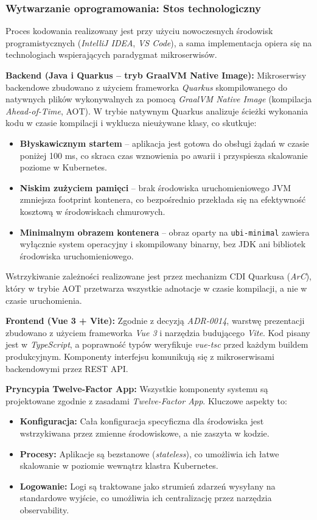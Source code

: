 \subsubsection{Wytwarzanie oprogramowania: Stos technologiczny}
Proces kodowania realizowany jest przy użyciu nowoczesnych środowisk programistycznych (\textit{IntelliJ IDEA}, \textit{VS Code}), a sama implementacja opiera się na technologiach wspierających paradygmat mikroserwisów.

\textbf{Backend (Java i Quarkus -- tryb GraalVM Native Image):}
Mikroserwisy backendowe zbudowano z użyciem frameworka \textit{Quarkus} skompilowanego do natywnych plików wykonywalnych za pomocą \textit{GraalVM Native Image} (kompilacja \textit{Ahead-of-Time}, AOT). W trybie natywnym Quarkus analizuje ścieżki wykonania kodu w czasie kompilacji i wyklucza nieużywane klasy, co skutkuje:
\begin{itemize}
    \item \textbf{Błyskawicznym startem} -- aplikacja jest gotowa do obsługi żądań w czasie poniżej 100 ms, co skraca czas wznowienia po awarii i przyspiesza skalowanie poziome w Kubernetes.
    \item \textbf{Niskim zużyciem pamięci} -- brak środowiska uruchomieniowego JVM zmniejsza footprint kontenera, co bezpośrednio przekłada się na efektywność kosztową w środowiskach chmurowych.
    \item \textbf{Minimalnym obrazem kontenera} -- obraz oparty na \texttt{ubi-minimal} zawiera wyłącznie system operacyjny i skompilowany binarny, bez JDK ani bibliotek środowiska uruchomieniowego.
\end{itemize}
Wstrzykiwanie zależności realizowane jest przez mechanizm CDI Quarkusa (\textit{ArC}), który w trybie AOT przetwarza wszystkie adnotacje w czasie kompilacji, a nie w czasie uruchomienia.

\textbf{Frontend (Vue 3 + Vite):}
Zgodnie z decyzją \textit{ADR-0014}, warstwę prezentacji zbudowano z użyciem frameworka \textit{Vue 3} i narzędzia budującego \textit{Vite}. Kod pisany jest w \textit{TypeScript}, a poprawność typów weryfikuje \textit{vue-tsc} przed każdym buildem produkcyjnym. Komponenty interfejsu komunikują się z mikroserwisami backendowymi przez REST API.

\textbf{Pryncypia Twelve-Factor App:}
Wszystkie komponenty systemu są projektowane zgodnie z zasadami \textit{Twelve-Factor App}. Kluczowe aspekty to:
\begin{itemize}
    \item \textbf{Konfiguracja:} Cała konfiguracja specyficzna dla środowiska jest wstrzykiwana przez zmienne środowiskowe, a nie zaszyta w kodzie.
    \item \textbf{Procesy:} Aplikacje są bezstanowe (\textit{stateless}), co umożliwia ich łatwe skalowanie w poziomie wewnątrz klastra Kubernetes.
    \item \textbf{Logowanie:} Logi są traktowane jako strumień zdarzeń wysyłany na standardowe wyjście, co umożliwia ich centralizację przez narzędzia observability.
\end{itemize}

